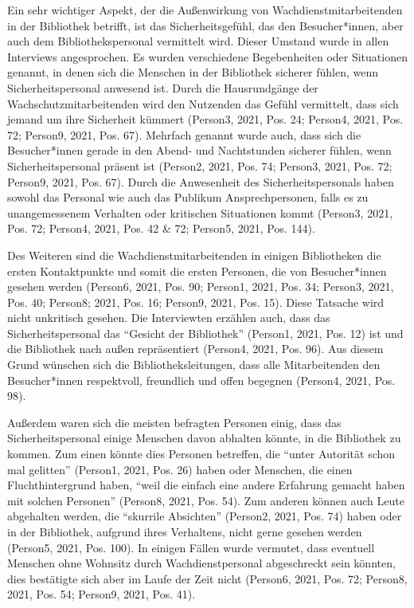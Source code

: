 \documentclass[a4paper,
fontsize=11pt,
oneside,
numbers=noperiodatend,
parskip=half-,
bibliography=totoc,
final
]{scrartcl}
\begin{document}
Ein sehr wichtiger Aspekt, der die Außenwirkung von
Wachdienstmitarbeitenden in der Bibliothek betrifft, ist das
Sicherheitsgefühl, das den Besucher*innen, aber auch dem
Bibliothekspersonal vermittelt wird. Dieser Umstand wurde in allen
Interviews angesprochen. Es wurden verschiedene Begebenheiten oder
Situationen genannt, in denen sich die Menschen in der Bibliothek
sicherer fühlen, wenn Sicherheitspersonal anwesend ist. Durch die
Hausrundgänge der Wachschutzmitarbeitenden wird den Nutzenden das Gefühl
vermittelt, dass sich jemand um ihre Sicherheit kümmert (Person3, 2021,
Pos. 24; Person4, 2021, Pos. 72; Person9, 2021, Pos. 67). Mehrfach
genannt wurde auch, dass sich die Besucher*innen gerade in den Abend-
und Nachtstunden sicherer fühlen, wenn Sicherheitspersonal präsent ist
(Person2, 2021, Pos. 74; Person3, 2021, Pos. 72; Person9, 2021, Pos.
67). Durch die Anwesenheit des Sicherheitspersonals haben sowohl das
Personal wie auch das Publikum Ansprechpersonen, falls es zu
unangemessenem Verhalten oder kritischen Situationen kommt (Person3,
2021, Pos. 72; Person4, 2021, Pos. 42 \& 72; Person5, 2021, Pos. 144).

Des Weiteren sind die Wachdienstmitarbeitenden in einigen Bibliotheken
die ersten Kontaktpunkte und somit die ersten Personen, die von
Besucher*innen gesehen werden (Person6, 2021, Pos. 90; Person1, 2021,
Pos. 34; Person3, 2021, Pos. 40; Person8; 2021, Pos. 16; Person9, 2021,
Pos. 15). Diese Tatsache wird nicht unkritisch gesehen. Die Interviewten
erzählen auch, dass das Sicherheitspersonal das \enquote{Gesicht der
Bibliothek} (Person1, 2021, Pos. 12) ist und die Bibliothek nach außen
repräsentiert (Person4, 2021, Pos. 96). Aus diesem Grund wünschen sich
die Bibliotheksleitungen, dass alle Mitarbeitenden den Besucher*innen
respektvoll, freundlich und offen begegnen (Person4, 2021, Pos. 98).

Außerdem waren sich die meisten befragten Personen einig, dass das
Sicherheitspersonal einige Menschen davon abhalten könnte, in die
Bibliothek zu kommen. Zum einen könnte dies Personen betreffen, die
\enquote{unter Autorität schon mal gelitten} (Person1, 2021, Pos. 26)
haben oder Menschen, die einen Fluchthintergrund haben, \enquote{weil
die einfach eine andere Erfahrung gemacht haben mit solchen Personen}
(Person8, 2021, Pos. 54). Zum anderen können auch Leute abgehalten
werden, die \enquote{skurrile Absichten} (Person2, 2021, Pos. 74) haben
oder in der Bibliothek, aufgrund ihres Verhaltens, nicht gerne gesehen
werden (Person5, 2021, Pos. 100). In einigen Fällen wurde vermutet, dass
eventuell Menschen ohne Wohnsitz durch Wachdienstpersonal abgeschreckt
sein könnten, dies bestätigte sich aber im Laufe der Zeit nicht
(Person6, 2021, Pos. 72; Person8, 2021, Pos. 54; Person9, 2021, Pos.
41).
\end{document}

